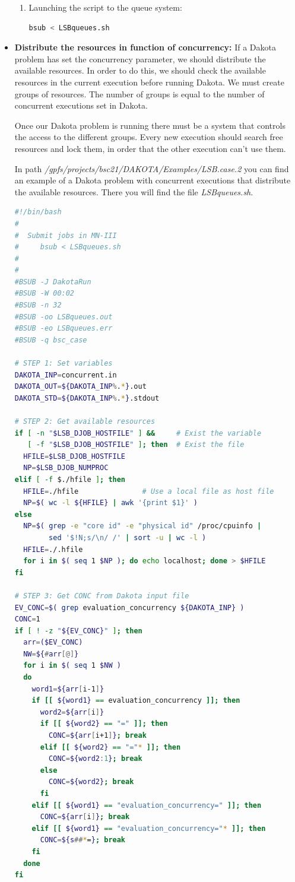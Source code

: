 \documentclass[12pt,a4paper,article]{memoir}
\begin{document}
\begin{itemize}
\begin{enumerate}
\item Launching the script to the queue system:
\begin{lstlisting}[style=MyCodeStyle,language=bash]
bsub < LSBqueues.sh
\end{lstlisting}
\end{enumerate}

\item \textbf{Distribute the resources in function of concurrency:}
If a Dakota problem has set the concurrency parameter, we should distribute the available resources. In order to do this, we should check the available resources in the current execution before running Dakota. We must create groups of resources. The number of groups is equal to the number of concurrent executions set in Dakota.

Once our Dakota problem is running there must be a system that controls the access to the different groups. Every new execution should search free resources and lock them, in order that the other execution can't use them.

In path \textit{/gpfs/projects/bsc21/DAKOTA/Examples/LSB.case.2} you can find an example of a Dakota problem with concurrent executions that distribute the available resources. There you will find the file \textit{LSBqueues.sh}.

\begin{lstlisting}[style=MyCodeStyle,language=bash]
#!/bin/bash
#
#  Submit jobs in MN-III  
#     bsub < LSBqueues.sh
#
#
#BSUB -J DakotaRun 
#BSUB -W 00:02
#BSUB -n 32
#BSUB -oo LSBqueues.out
#BSUB -eo LSBqueues.err
#BSUB -q bsc_case

# STEP 1: Set variables
DAKOTA_INP=concurrent.in
DAKOTA_OUT=${DAKOTA_INP%.*}.out
DAKOTA_STD=${DAKOTA_INP%.*}.stdout

# STEP 2: Get available resources
if [ -n "$LSB_DJOB_HOSTFILE" ] &&     # Exist the variable
   [ -f "$LSB_DJOB_HOSTFILE" ]; then  # Exist the file
  HFILE=$LSB_DJOB_HOSTFILE
  NP=$LSB_DJOB_NUMPROC
elif [ -f $./hfile ]; then
  HFILE=./hfile               # Use a local file as host file
  NP=$( wc -l ${HFILE} | awk '{print $1}' )
else
  NP=$( grep -e "core id" -e "physical id" /proc/cpuinfo |
        sed '$!N;s/\n/ /' | sort -u | wc -l )
  HFILE=./.hfile
  for i in $( seq 1 $NP ); do echo localhost; done > $HFILE
fi

# STEP 3: Get CONC from Dakota input file
EV_CONC=$( grep evaluation_concurrency ${DAKOTA_INP} )
CONC=1
if [ ! -z "${EV_CONC}" ]; then
  arr=($EV_CONC)
  NW=${#arr[@]}
  for i in $( seq 1 $NW )
  do
    word1=${arr[i-1]}
    if [[ ${word1} == evaluation_concurrency ]]; then
      word2=${arr[i]}
      if [[ ${word2} == "=" ]]; then
        CONC=${arr[i+1]}; break
      elif [[ ${word2} == "="* ]]; then
        CONC=${word2:1}; break
      else
        CONC=${word2}; break
      fi
    elif [[ ${word1} == "evaluation_concurrency=" ]]; then
      CONC=${arr[i]}; break
    elif [[ ${word1} == "evaluation_concurrency="* ]]; then
      CONC=${s##*=}; break
    fi
  done
fi


\end{lstlisting}
\end{itemize}
\end{document}
